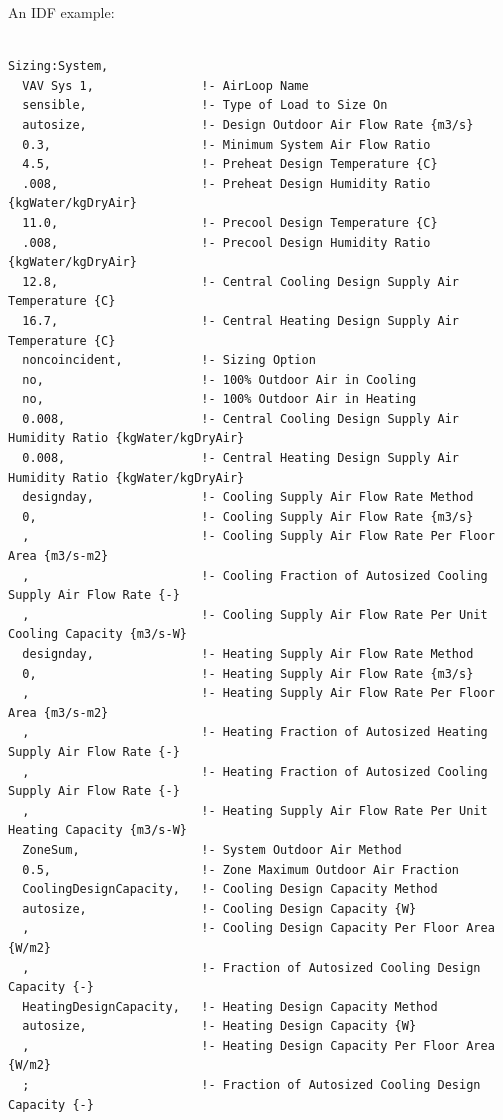 An IDF example:

\begin{lstlisting}

Sizing:System,
  VAV Sys 1,               !- AirLoop Name
  sensible,                !- Type of Load to Size On
  autosize,                !- Design Outdoor Air Flow Rate {m3/s}
  0.3,                     !- Minimum System Air Flow Ratio
  4.5,                     !- Preheat Design Temperature {C}
  .008,                    !- Preheat Design Humidity Ratio {kgWater/kgDryAir}
  11.0,                    !- Precool Design Temperature {C}
  .008,                    !- Precool Design Humidity Ratio {kgWater/kgDryAir}
  12.8,                    !- Central Cooling Design Supply Air Temperature {C}
  16.7,                    !- Central Heating Design Supply Air Temperature {C}
  noncoincident,           !- Sizing Option
  no,                      !- 100% Outdoor Air in Cooling
  no,                      !- 100% Outdoor Air in Heating
  0.008,                   !- Central Cooling Design Supply Air Humidity Ratio {kgWater/kgDryAir}
  0.008,                   !- Central Heating Design Supply Air Humidity Ratio {kgWater/kgDryAir}
  designday,               !- Cooling Supply Air Flow Rate Method
  0,                       !- Cooling Supply Air Flow Rate {m3/s}
  ,                        !- Cooling Supply Air Flow Rate Per Floor Area {m3/s-m2}
  ,                        !- Cooling Fraction of Autosized Cooling Supply Air Flow Rate {-}
  ,                        !- Cooling Supply Air Flow Rate Per Unit Cooling Capacity {m3/s-W}
  designday,               !- Heating Supply Air Flow Rate Method
  0,                       !- Heating Supply Air Flow Rate {m3/s}
  ,                        !- Heating Supply Air Flow Rate Per Floor Area {m3/s-m2}
  ,                        !- Heating Fraction of Autosized Heating Supply Air Flow Rate {-}
  ,                        !- Heating Fraction of Autosized Cooling Supply Air Flow Rate {-}
  ,                        !- Heating Supply Air Flow Rate Per Unit Heating Capacity {m3/s-W}
  ZoneSum,                 !- System Outdoor Air Method
  0.5,                     !- Zone Maximum Outdoor Air Fraction
  CoolingDesignCapacity,   !- Cooling Design Capacity Method
  autosize,                !- Cooling Design Capacity {W}
  ,                        !- Cooling Design Capacity Per Floor Area {W/m2}
  ,                        !- Fraction of Autosized Cooling Design Capacity {-}
  HeatingDesignCapacity,   !- Heating Design Capacity Method
  autosize,                !- Heating Design Capacity {W}
  ,                        !- Heating Design Capacity Per Floor Area {W/m2}
  ;                        !- Fraction of Autosized Cooling Design Capacity {-}
\end{lstlisting}

